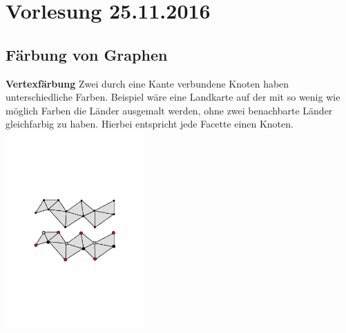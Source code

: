 \section{Vorlesung 25.11.2016}
\subsection{Färbung von Graphen}
\textbf{Vertexfärbung}\newline
Zwei durch eine Kante verbundene Knoten haben unterschiedliche Farben. \newline
Beispiel wäre eine Landkarte auf der mit so wenig wie möglich Farben die Länder ausgemalt werden, ohne zwei benachbarte Länder gleichfarbig zu haben. Hierbei entspricht jede Facette einen Knoten.\newline
\includegraphics[width=0.4\textwidth]{lectures/161118/pix/Vertexfaerbung}